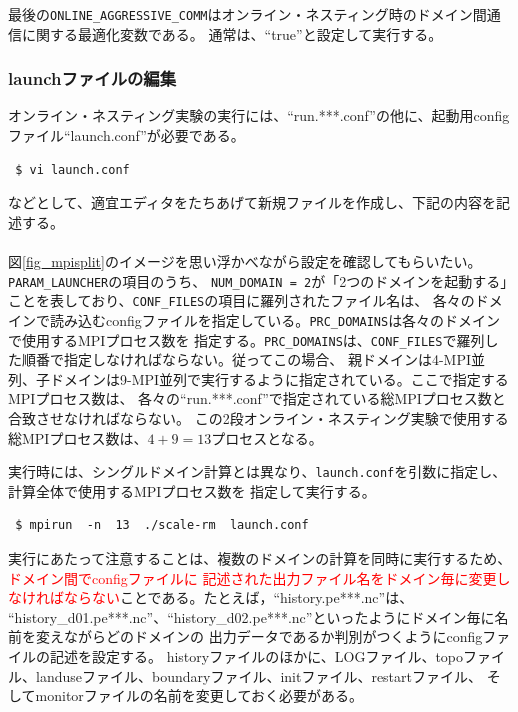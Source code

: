 最後の\verb|ONLINE_AGGRESSIVE_COMM|はオンライン・ネスティング時のドメイン間通信に関する最適化変数である。
通常は、``true''と設定して実行する。


\subsubsection{launchファイルの編集}
オンライン・ネスティング実験の実行には、``run.***.conf''の他に、起動用configファイル``launch.conf''が必要である。
\begin{verbatim}
 $ vi launch.conf
\end{verbatim}
などとして、適宜エディタをたちあげて新規ファイルを作成し、下記の内容を記述する。\\

\\

\noindent 図\ref{fig_mpisplit}のイメージを思い浮かべながら設定を確認してもらいたい。\verb|PARAM_LAUNCHER|の項目のうち、
\verb|NUM_DOMAIN = 2|が「2つのドメインを起動する」ことを表しており、\verb|CONF_FILES|の項目に羅列されたファイル名は、
各々のドメインで読み込むconfigファイルを指定している。\verb|PRC_DOMAINS|は各々のドメインで使用するMPIプロセス数を
指定する。\verb|PRC_DOMAINS|は、\verb|CONF_FILES|で羅列した順番で指定しなければならない。従ってこの場合、
親ドメインは4-MPI並列、子ドメインは9-MPI並列で実行するように指定されている。ここで指定するMPIプロセス数は、
各々の``run.***.conf''で指定されている総MPIプロセス数と合致させなければならない。
この2段オンライン・ネスティング実験で使用する総MPIプロセス数は、$4 + 9 = 13$プロセスとなる。

実行時には、シングルドメイン計算とは異なり、\verb|launch.conf|を引数に指定し、計算全体で使用するMPIプロセス数を
指定して実行する。
\begin{verbatim}
 $ mpirun  -n  13  ./scale-rm  launch.conf
\end{verbatim}

実行にあたって注意することは、複数のドメインの計算を同時に実行するため、\textcolor{red}{ドメイン間でconfigファイルに
記述された出力ファイル名をドメイン毎に変更しなければならない}ことである。たとえば，``history.pe***.nc''は、
``history\_d01.pe***.nc''、``history\_d02.pe***.nc''といったようにドメイン毎に名前を変えながらどのドメインの
出力データであるか判別がつくようにconfigファイルの記述を設定する。
historyファイルのほかに、LOGファイル、topoファイル、landuseファイル、boundaryファイル、initファイル、restartファイル、
そしてmonitorファイルの名前を変更しておく必要がある。

